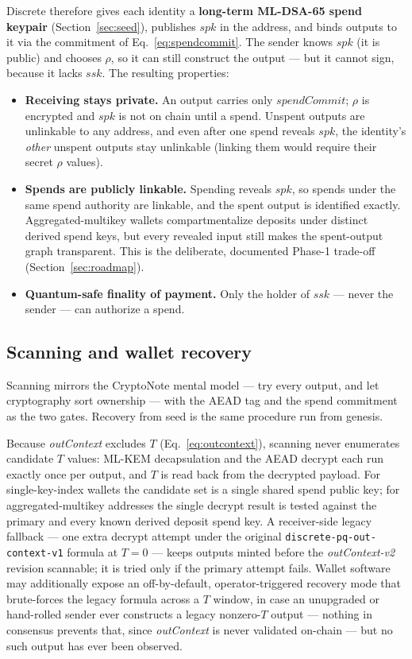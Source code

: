 \documentclass[11pt,a4paper]{article}
\newcommand{\code}[1]{\texttt{\small #1}}
\begin{document}
Discrete therefore gives each identity a \textbf{long-term ML-DSA-65 spend
keypair} (Section~\ref{sec:seed}), publishes $\mathit{spk}$ in the address,
and binds outputs to it via the commitment of
Eq.~\eqref{eq:spendcommit}. The sender knows $\mathit{spk}$ (it is public)
and chooses $\rho$, so it can still construct the output --- but it cannot
sign, because it lacks $\mathit{ssk}$. The resulting properties:

\begin{itemize}
\item \textbf{Receiving stays private.} An output carries only
  $\mathit{spendCommit}$; $\rho$ is encrypted and $\mathit{spk}$ is not on
  chain until a spend. Unspent outputs are unlinkable to any address, and even
  after one spend reveals $\mathit{spk}$, the identity's \emph{other} unspent
  outputs stay unlinkable (linking them would require their secret $\rho$
  values).
\item \textbf{Spends are publicly linkable.} Spending reveals
  $\mathit{spk}$, so spends under the same spend authority are linkable, and the
  spent output is identified exactly. Aggregated-multikey wallets compartmentalize
  deposits under distinct derived spend keys, but every revealed input still makes
  the spent-output graph transparent. This is the deliberate, documented Phase-1
  trade-off (Section~\ref{sec:roadmap}).
\item \textbf{Quantum-safe finality of payment.} Only the holder of
  $\mathit{ssk}$ --- never the sender --- can authorize a spend.
\end{itemize}

\subsection{Scanning and wallet recovery}\label{sec:scanning}

Scanning mirrors the CryptoNote mental model --- try every output, and let
cryptography sort ownership --- with the AEAD tag and the spend commitment as
the two gates. Recovery from seed is the same procedure run from genesis.

Because \emph{outContext} excludes $T$ (Eq.~\eqref{eq:outcontext}), scanning
never enumerates candidate $T$ values: ML-KEM decapsulation and the AEAD
decrypt each run exactly once per output, and $T$ is read back from the
decrypted payload. For single-key-index wallets the candidate set is a single
shared spend public key; for aggregated-multikey addresses the single decrypt
result is tested against the primary and every known derived deposit spend
key. A receiver-side legacy fallback --- one extra decrypt attempt under the
original \code{discrete-pq-out-context-v1} formula at $T{=}0$ --- keeps
outputs minted before the \emph{outContext-v2} revision scannable; it is
tried only if the primary attempt fails. Wallet software may additionally
expose an off-by-default, operator-triggered recovery mode that brute-forces
the legacy formula across a $T$ window, in case an unupgraded or hand-rolled
sender ever constructs a legacy nonzero-$T$ output --- nothing in consensus
prevents that, since \emph{outContext} is never validated on-chain --- but no
such output has ever been observed.
\end{document}
